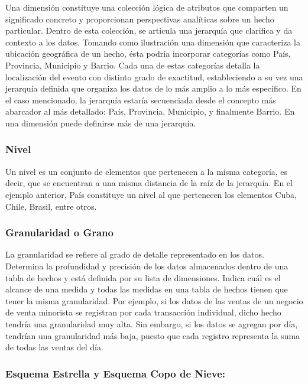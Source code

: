 Una dimensión constituye una colección lógica de atributos que comparten un significado concreto y proporcionan 
perspectivas analíticas sobre un hecho particular. Dentro de esta colección, se articula una jerarquía que clarifica y da contexto a los 
datos. Tomando como ilustración una dimensión que caracteriza la ubicación geográfica de un hecho, ésta podría incorporar categorías 
como País, Provincia, Municipio y Barrio. Cada una de estas categorías detalla la localización del evento con distinto grado de 
exactitud, estableciendo a su vez una jerarquía definida que organiza los datos de lo más amplio a lo más específico. En el 
caso mencionado, la jerarquía estaría secuenciada desde el concepto más abarcador al más detallado: País, Provincia, 
Municipio, y finalmente Barrio. En una dimensión puede definirse m\'as de una jerarquía\cite{lismaster}.

\subsubsection{Nivel}

Un nivel es un conjunto de elementos que pertenecen a la misma categoría, es decir, que se encuentran a una misma distancia 
de la raíz de la jerarquía. En el ejemplo anterior, Pa\'is constituye un nivel al que pertenecen los elementos Cuba, Chile, 
Brasil, entre otros.

\subsubsection{Granularidad o Grano}

La granularidad se refiere al grado de detalle representado en los datos. Determina 
la profundidad y precisión de los datos almacenados dentro de una tabla de hechos y est\'a definida por su lista de dimensiones. 
Indica cu\'al es el alcance de una medida y todas las medidas en una tabla de hechos tienen que tener la misma 
granularidad\cite{kimball2011data}. Por ejemplo, si los datos de las ventas de un negocio de venta minorista 
se registran por cada transacción individual, dicho hecho tendr\'ia una granularidad muy alta. Sin embargo, 
si los datos se agregan por d\'ia, tendrían una granularidad m\'as baja, puesto que cada registro representa la suma 
de todas las ventas del d\'ia.

\subsubsection{Esquema Estrella y Esquema Copo de Nieve:}

